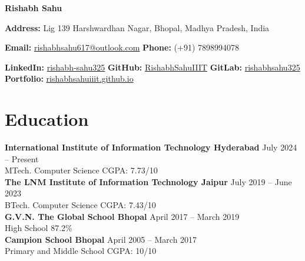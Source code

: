 \documentclass{article}
\begin{document}
\fontsize{11pt}{13pt}\selectfont  %

\begin{center}
	{\Huge \textbf{Rishabh Sahu}} \\ \vspace{3pt}

	{\fontsize{12pt}{12.5pt}\selectfont {}\enspace \textbf{Address:} Lig 139 Harshwardhan Nagar, Bhopal, Madhya Pradesh, India} \\ \vspace{3pt}

	{\fontsize{12pt}{12.5pt}\selectfont
		\enspace \textbf{Email:} \href{mailto:rishabhsahu617@outlook.com}{rishabhsahu617@outlook.com}
		\quad \textbullet \quad
		\enspace \textbf{Phone:} (+91) 7898994078
	} \\ \vspace{3pt}

	{\fontsize{12pt}{12.5pt}\selectfont
		\enspace \textbf{LinkedIn:} \href{https://www.linkedin.com/in/rishabh-sahu325}{rishabh-sahu325}
		\quad \textbullet \quad
		\enspace \textbf{GitHub:} \href{https://github.com/RishabhSahuIIIT}{RishabhSahuIIIT}
		\quad \textbullet \quad
		\enspace \textbf{GitLab:} \href{https://gitlab.com/rishabhsahu325}{rishabhsahu325}
		\quad \textbullet \quad
		\enspace \textbf{Portfolio:} \href{https://rishabhsahuiiit.github.io/}{rishabhsahuiiit.github.io}
	}
\end{center}
\section*{Education}
\begin{flushleft}
	\noindent\large\textbf{International Institute of Information Technology Hyderabad} \hfill July 2024 -- Present \\
	MTech. Computer Science \hfill CGPA: 7.73/10\\
	\vspace{0.1cm}
	\noindent\large\textbf{The LNM Institute of Information Technology Jaipur} \hfill July 2019 -- June 2023 \\
	BTech. Computer Science \hfill CGPA: 7.43/10\\
	\vspace{0.1cm}
	\noindent\large\textbf{G.V.N. The Global School Bhopal} \hfill April 2017 -- March 2019 \\ High School \hfill 87.2\%\\
	\vspace{0.1cm}
	\noindent\large\textbf{Campion School Bhopal} \hfill April 2005 -- March 2017 \\ Primary and Middle School \hfill CGPA: 10/10\\
\end{flushleft}
\end{document}
